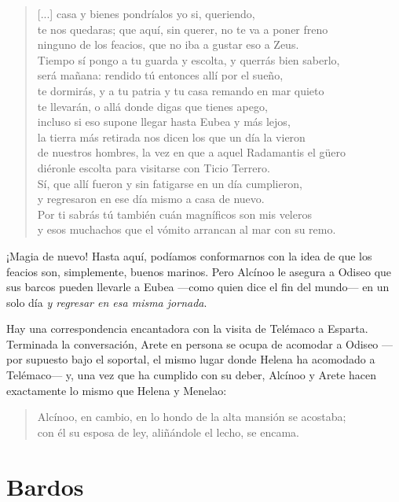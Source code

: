 \begin{verse}
[...] casa y bienes pondríalos yo si, queriendo,\\
te nos quedaras; que aquí, sin querer, no te va a poner freno\\
ninguno de los feacios, que no iba a gustar eso a Zeus.\\
Tiempo sí pongo a tu guarda y escolta, y querrás bien saberlo,\\
será mañana: rendido tú entonces allí por el sueño,\\
te dormirás, y a tu patria y tu casa remando en mar quieto\\
te llevarán, o allá donde digas que tienes apego,\\
incluso si eso supone llegar hasta Eubea y más lejos,\\
la tierra más retirada nos dicen los que un día la vieron\\
de nuestros hombres, la vez en que a aquel Radamantis el güero\\
diéronle escolta para visitarse con Ticio Terrero.\\
Sí, que allí fueron y sin fatigarse en un día cumplieron,\\
y regresaron en ese día mismo a casa de nuevo.\\
Por ti sabrás tú también cuán magníficos son mis veleros\\
y esos muchachos que el vómito arrancan al mar con su remo.
\end{verse}

¡Magia de nuevo! Hasta aquí, podíamos conformarnos con la idea de que los feacios son, simplemente, buenos marinos. Pero Alcínoo le asegura a Odiseo que sus barcos pueden llevarle a Eubea ---como quien dice el fin del mundo--- en un solo día \emph{y regresar en esa misma jornada}.

Hay una correspondencia encantadora con la visita de Telémaco a Esparta. Terminada la conversación, Arete en persona se ocupa de acomodar a Odiseo ---por supuesto bajo el soportal, el mismo lugar donde Helena ha acomodado a Telémaco--- y, una vez que ha cumplido con su deber, Alcínoo y Arete hacen exactamente lo mismo que Helena y Menelao:

\begin{verse}
Alcínoo, en cambio, en lo hondo de la alta mansión se acostaba;\\
con él su esposa de ley, aliñándole el lecho, se encama.
\end{verse}


\section*{Bardos}


